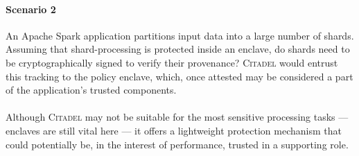 \paragraph{Scenario 2} An Apache Spark application partitions input data into a large number of shards. Assuming that shard-processing is protected inside an enclave, do shards need to be cryptographically signed to verify their provenance? \textsc{Citadel} would entrust this tracking to the policy enclave, which, once attested may be considered a part of the application's trusted components.

\paragraph{} Although \textsc{Citadel} may not be suitable for the most sensitive processing tasks --- enclaves are still vital here --- it offers a lightweight protection mechanism that could potentially be, in the interest of performance, trusted in a supporting role.
